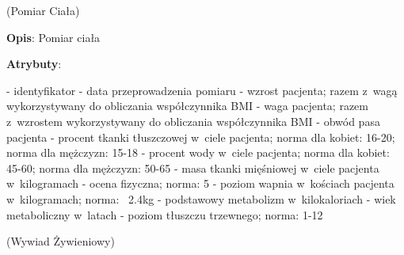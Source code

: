\begin{enumerate}[label={\textbf{KAT/\protect\threedigits{\theenumi}}}, wide, labelwidth=!, labelindent=0pt, labelsep=0pt, series=reqs]
    \label{kat:BodyMeasurement} (Pomiar Ciała)

    \textbf{Opis}: Pomiar ciała
    \par
    \textbf{Atrybuty}:
    \begin{itemize}[series=atr, wide, align=left, leftmargin=190pt]
        \label{kat:BodyMeasurement:id}- identyfikator
        \label{kat:BodyMeasurement:completionDate}- data przeprowadzenia pomiaru
        \label{kat:BodyMeasurement:height}- wzrost pacjenta; razem z~wagą wykorzystywany do obliczania współczynnika BMI
        \label{kat:BodyMeasurement:weight}- waga pacjenta; razem z~wzrostem wykorzystywany do obliczania współczynnika BMI
        \label{kat:BodyMeasurement:waist}- obwód pasa pacjenta
        \label{kat:BodyMeasurement:percentOfFatTissue}- procent tkanki tłuszczowej w~ciele pacjenta; norma dla kobiet: 16-20; norma dla mężczyzn: 15-18
        \label{kat:BodyMeasurement:percentOfWater}- procent wody w~ciele pacjenta; norma dla kobiet: 45-60; norma dla mężczyzn: 50-65
        \label{kat:BodyMeasurement:muscleMass}- masa tkanki mięśniowej w~ciele pacjenta w~kilogramach
        \label{kat:BodyMeasurement:physicalMark}- ocena fizyczna; norma: 5
        \label{kat:BodyMeasurement:calciumInBones}- poziom wapnia w~kościach pacjenta w~kilogramach; norma: ~2.4kg
        \label{kat:BodyMeasurement:basicMetabolism}- podstawowy metabolizm w~kilokaloriach
        \label{kat:BodyMeasurement:metabolicAge}- wiek metaboliczny w~latach
        \label{kat:BodyMeasurement:visceralFatLevel}- poziom tłuszczu trzewnego; norma: 1-12
    \end{itemize}

    \label{kat:NutritionalInterview} (Wywiad Żywieniowy)


\end{enumerate}
